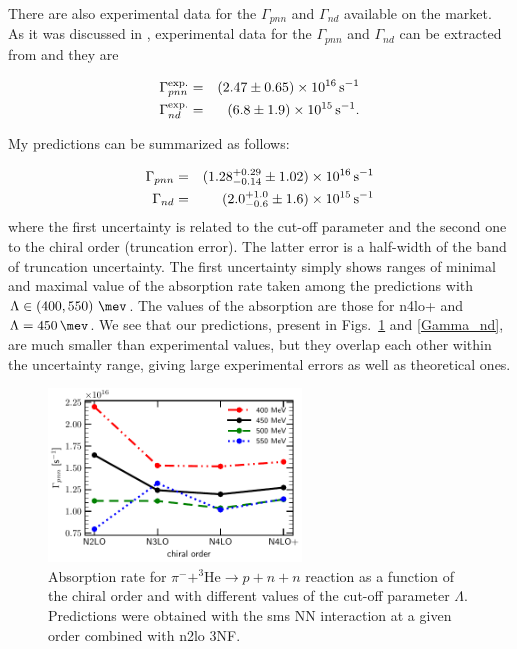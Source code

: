     There are also experimental data for the $\Gamma_{pnn}$ and $\Gamma_{nd}$ available on the market.
    As it was discussed in \cite{golak_pion}, experimental data for the $\Gamma_{pnn}$ and $\Gamma_{nd}$ 
    can be extracted from \cite{SCHWANNER1984,McCarthy1975,truol1974} and they are

    \begin{eqnarray}\label{Gam_He_exp}
        \Gamma_{pnn} ^{\rm exp.} & =& (2.47\pm 0.65)\times 10^{16} \, {\rm s^{-1}}\\
        \Gamma_{nd}^{\rm exp.} & =  & (6.8\pm 1.9)\times 10^{15} \, {\rm s^{-1}}.
    \end{eqnarray}

    My predictions can be summarized as follows:

    \begin{eqnarray}\label{Gam_nd_our}
        \Gamma_{pnn}  & =& (1.28^{+ 0.29}_{-0.14} \pm 1.02)\times 10^{16} \, {\rm s^{-1}}\label{Gam_nd_pnn_our}\\ 
        \Gamma_{nd} & =  & (2.0^{+1.0}_{-0.6}\pm 1.6)\times 10^{15} \, {\rm s^{-1}} \label{Gam_pnn_our}
    \end{eqnarray}
    where the first uncertainty is related to the cut-off parameter and the second one to the chiral order (truncation error). The latter error is a half-width of the band of truncation uncertainty.
    The first uncertainty simply shows ranges of minimal and maximal value
    of the absorption rate taken among the predictions with $\Lambda \in (400, 550)~\SI{}{\mev}$.
    The values of the absorption are those for \gls{n4lo+} and $\Lambda=\SI{450}{\mev}$.
    We see that our predictions, present in Figs.~\ref{Gamma_pnn} and \ref{Gamma_nd}, are 
    much smaller than experimental values,
    but they overlap each other within the uncertainty range,
    giving large experimental errors as well as theoretical ones.



    \begin{figure}[h]
        \begin{center}
        \includegraphics[width=0.6\textwidth]{PlotData/PION/Dalitz_maps/figures/Gamma_pnn.pdf}
        \end{center}
        \caption{Absorption rate for $\pi^- + ^3\text{He} \rightarrow p + n + n$ reaction as a function
        of the chiral order and with different values of the cut-off parameter $\Lambda$.
        Predictions were obtained with the \gls{sms} NN interaction at a given order combined
        with \gls{n2lo} 3NF.}
        \label{Gamma_pnn}
    \end{figure}

